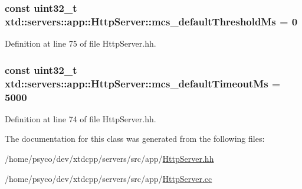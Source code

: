 \subsubsection[{\texorpdfstring{mcs\+\_\+default\+Threshold\+Ms}{mcs_defaultThresholdMs}}]{\setlength{\rightskip}{0pt plus 5cm}const uint32\+\_\+t xtd\+::servers\+::app\+::\+Http\+Server\+::mcs\+\_\+default\+Threshold\+Ms = 0\hspace{0.3cm}{\ttfamily [static]}}\hypertarget{classxtd_1_1servers_1_1app_1_1HttpServer_ad21741083478d35b92ba0b1da7499950}{}\label{classxtd_1_1servers_1_1app_1_1HttpServer_ad21741083478d35b92ba0b1da7499950}


Definition at line 75 of file Http\+Server.\+hh.

\subsubsection[{\texorpdfstring{mcs\+\_\+default\+Timeout\+Ms}{mcs_defaultTimeoutMs}}]{\setlength{\rightskip}{0pt plus 5cm}const uint32\+\_\+t xtd\+::servers\+::app\+::\+Http\+Server\+::mcs\+\_\+default\+Timeout\+Ms = 5000\hspace{0.3cm}{\ttfamily [static]}}\hypertarget{classxtd_1_1servers_1_1app_1_1HttpServer_abdc02697ffc7fa9f8f88252101b5d1b9}{}\label{classxtd_1_1servers_1_1app_1_1HttpServer_abdc02697ffc7fa9f8f88252101b5d1b9}


Definition at line 74 of file Http\+Server.\+hh.



The documentation for this class was generated from the following files\+:\begin{DoxyCompactItemize}
\item 
/home/psyco/dev/xtdcpp/servers/src/app/\hyperlink{HttpServer_8hh}{Http\+Server.\+hh}\item 
/home/psyco/dev/xtdcpp/servers/src/app/\hyperlink{HttpServer_8cc}{Http\+Server.\+cc}\end{DoxyCompactItemize}
